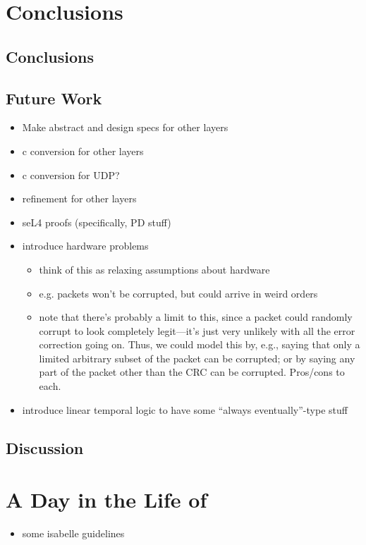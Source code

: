 \documentclass[twoside]{memoir}
\begin{document}
\chapter{Conclusions}
\section{Conclusions}
\section{Future Work}
\begin{itemize}
    \item Make abstract and design specs for other layers
    \item c conversion for other layers
    \item c conversion for UDP?
    \item refinement for other layers
    \item seL4 proofs (specifically, PD stuff)
    \item introduce hardware problems
        \begin{itemize}
            \item think of this as relaxing assumptions about hardware
            \item e.g. packets won't be corrupted, but could arrive in weird orders
            \item note that there's probably a limit to this,
                since a packet could randomly corrupt to
                look completely legit---it's just very
                unlikely with all the error correction
                going on.
                Thus, we could model this by, e.g.,
                saying that only a limited arbitrary subset
                of the packet can be corrupted;
                or by saying any part of the packet other
                than the CRC can be corrupted.
                Pros/cons to each.
        \end{itemize}
    \item introduce linear temporal logic to have some ``always eventually''-type stuff
\end{itemize}
\section{Discussion}

\chapter{A Day in the Life of}
\begin{itemize}
    \item some isabelle guidelines
\end{itemize}
\end{document}
